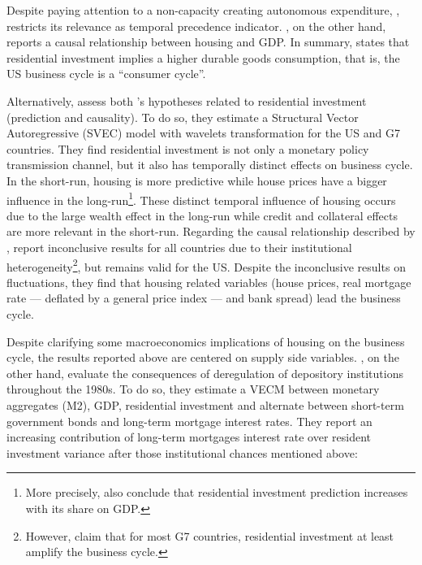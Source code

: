 \documentclass[12pt, a4]{article}
\begin{document}
Despite paying attention to a non-capacity creating autonomous expenditure, \textcite{green_follow_1997}, restricts its relevance as temporal precedence indicator.
\textcite{leamer_housing_2007}, on the other hand, reports a causal relationship between housing and GDP.
In summary, states that residential investment implies a higher durable goods consumption, that is, the US business cycle is a ``consumer cycle''.

Alternatively, \textcite{huang_is_2018} assess both \citeauthor*{leamer_housing_2007}'s \citeyear{leamer_housing_2007} hypotheses related to residential investment (prediction and causality).
To do so, they estimate a Structural Vector Autoregressive (SVEC) model with wavelets transformation for the US and G7 countries.
They find residential investment is not only a monetary policy transmission channel, but it also has temporally distinct effects on business cycle.
In the short-run, housing is more predictive while house prices have a bigger influence in the long-run\footnote{More precisely, \textcite{huang_is_2018} also conclude that residential investment prediction increases with its share on GDP.}. 
These distinct temporal influence of housing occurs due to the large wealth effect in the long-run while credit and collateral effects are more relevant in the short-run.
Regarding the causal relationship described by \textcite{leamer_housing_2007}, 
\textcite{huang_is_2018} report inconclusive results for all countries due to their institutional heterogeneity\footnote{However, \textcite{huang_is_2018} claim that for most G7 countries, residential investment at least amplify the business cycle.}, but remains valid for the US.
Despite the inconclusive results on fluctuations, they find that housing related variables (house prices, real mortgage rate --- deflated by a general price index --- and bank spread) lead the business cycle.

Despite clarifying some macroeconomics  implications of housing on the business cycle, the results reported above are centered on supply side variables.
\textcite{gauger_residential_2003}, on the other hand, evaluate the consequences of deregulation of depository institutions throughout the 1980s.
To do so, they estimate a VECM between monetary aggregates (M2), GDP, residential investment and alternate between short-term government bonds and long-term mortgage interest rates. 
They report an increasing contribution of long-term mortgages interest rate over resident investment variance after those institutional chances mentioned above:
\end{document}
